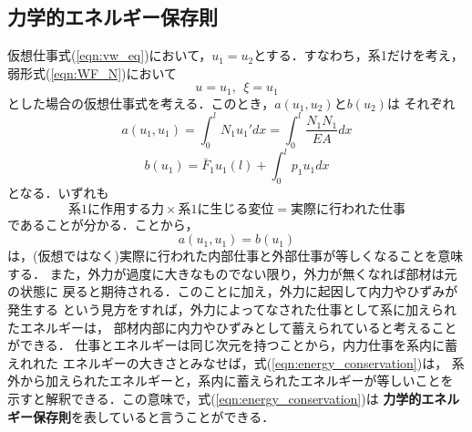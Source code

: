\documentclass[10pt,a4j]{jarticle}
\begin{document}
\subsection{力学的エネルギー保存則}
仮想仕事式(\ref{eqn:vw_eq})において，$u_1=u_2$とする．すなわち，系1だけを考え，
弱形式(\ref{eqn:WF_N})において
\[
	u=u_1, \ \ \xi=u_1
\]
とした場合の仮想仕事式を考える．このとき，$a(u_1,u_2)$と$b(u_2)$は
それぞれ
\begin{equation}
	a(u_1,u_1)=\int_0^l N_1u_1'dx = \int_0^l\frac{N_1N_1}{EA}dx
	\label{eqn:w_int}
\end{equation}
\begin{equation}
	b(u_1)=\bar F_1 u_1(l)+\int_0^l p_1 u_1dx
	\label{eqn:w_ext}
\end{equation}
となる．いずれも
\[
	系1に作用する力 \times 系1に生じる変位 = 実際に行われた仕事
\]
であることが分かる．ことから，
\begin{equation}
	a(u_1,u_1)=b(u_1)
	\label{eqn:energy_conservation}
\end{equation}
は，(仮想ではなく)実際に行われた内部仕事と外部仕事が等しくなることを意味する．
また，外力が過度に大きなものでない限り，外力が無くなれば部材は元の状態に
戻ると期待される．このことに加え，外力に起因して内力やひずみが発生する
という見方をすれば，外力によってなされた仕事として系に加えられたエネルギーは，
部材内部に内力やひずみとして蓄えられていると考えることができる．
仕事とエネルギーは同じ次元を持つことから，内力仕事を系内に蓄えれれた
エネルギーの大きさとみなせば，式(\ref{eqn:energy_conservation})は，
系外から加えられたエネルギーと，系内に蓄えられたエネルギーが等しいことを
示すと解釈できる．この意味で，式(\ref{eqn:energy_conservation})は
{\bf 力学的エネルギー保存則}を表していると言うことができる．
\end{document}
